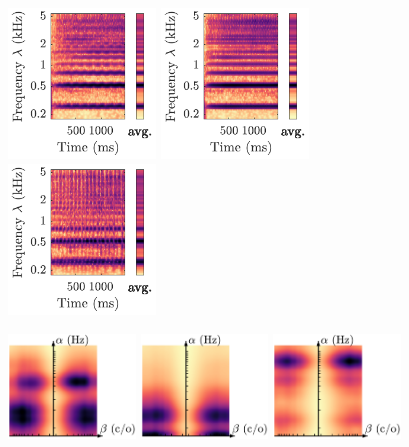 \documentclass{bmcart}
\begin{document}
\begin{backmatter}
\begin{figure}
\includegraphics[height=4cm]{Vn-ord-C4-mf-4c_scalogram.pdf}
\hspace{8mm}
\includegraphics[trim=35 0 0 0, clip, height=4cm]{Vn-nonvib-C4-mf-4c_scalogram.pdf}
\hspace{12mm}
\includegraphics[trim=35 0 0 0, clip, height=4cm]{Vn-trem-C4-mf-4c_scalogram.pdf}

\hspace{2mm}
\includegraphics[height=28mm]{Vn-ord-C4-mf-4c_scattering.pdf}
\hspace{5mm}
\includegraphics[height=28mm]{Vn-nonvib-C4-mf-4c_scattering.pdf}
\hspace{5mm}
\includegraphics[trim=0 0 77 0, clip, height=28mm]{Vn-trem-C4-mf-4c_scattering.pdf}


\end{figure}
\end{backmatter}
\end{document}
